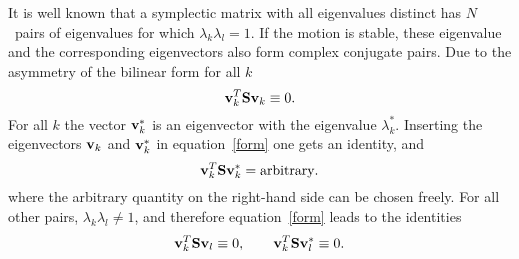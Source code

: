 It is well known that a symplectic matrix with all eigenvalues distinct
has $N$~pairs of eigenvalues for which $\lambda_k\lambda_l=1$.
If the motion is stable, these eigenvalue and the corresponding
eigenvectors also form complex conjugate pairs.
Due to the asymmetry of the bilinear form for all $k$
\begin{equation}
\bold{v}_k^T \bold{S} \bold{v}_k \equiv 0.
\end{equation}
For all $k$ the vector $\bold{v}_k^*$ is an eigenvector with the
eigenvalue $\lambda_k^*$.
Inserting the eigenvectors $\bold{v}_k$ and $\bold{v}_k^*$ in
equation~\ref{form} one gets an identity, and 
\begin{equation}
\bold{v}_k^T \bold{S} \bold{v}_k^* = \hbox{\rm arbitrary}.
\end{equation}
where the arbitrary quantity on the right-hand side can be chosen freely.
For all other pairs, $\lambda_k \lambda_l \ne 1$,
and therefore equation~\ref{form} leads to the identities
\begin{equation}
\bold{v}_k^T \bold{S} \bold{v}_l \equiv 0, \qquad
\bold{v}_k^T \bold{S} \bold{v}_l^* \equiv 0.
\end{equation} 
 
 
